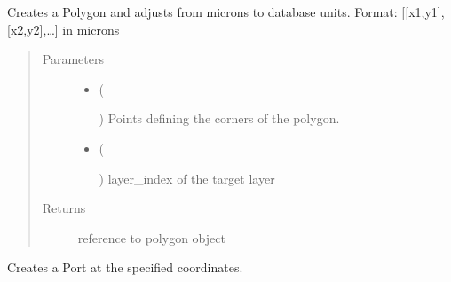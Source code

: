 \documentclass[a4paper,10pt,english]{sphinxmanual}
\begin{document}
\begin{fulllineitems}

\begin{fulllineitems}
\label{\detokenize{photonics/photonics:kppc.photonics.PhotDevice.create_polygon}}
Creates a Polygon and adjusts from microns to database units. Format: {[}{[}x1,y1{]},{[}x2,y2{]},…{]} in microns
\begin{quote}\begin{description}
\item[{Parameters}] \leavevmode\begin{itemize}
\item {} 
 (%
\begin{footnote}[60]\sphinxAtStartFootnote
{}
%
\end{footnote}) \textendash{} Points defining the corners of the polygon.

\item {} 
 (%
\begin{footnote}[61]\sphinxAtStartFootnote
{}
%
\end{footnote}) \textendash{} layer\_index of the target layer

\end{itemize}

\item[{Returns}] \leavevmode
reference to polygon object

\end{description}\end{quote}

\end{fulllineitems}


\begin{fulllineitems}
\label{\detokenize{photonics/photonics:kppc.photonics.PhotDevice.create_port}}
Creates a Port at the specified coordinates.


\end{fulllineitems}
\end{fulllineitems}
\end{document}
